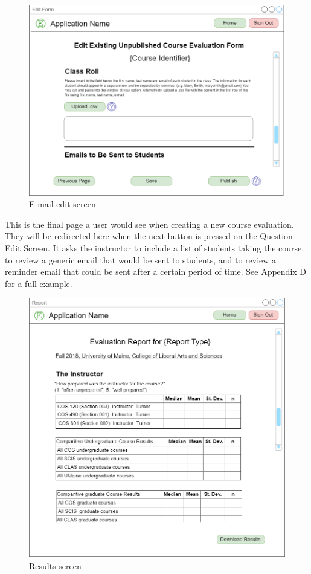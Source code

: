 \documentclass{article}
\begin{document}
\begin{center}
\begin{figure}[H]
    \centering
    \caption{E-mail edit screen}
    \includegraphics[scale=.30]{images/emails_screen.png}
\end{figure}
\end{center}

This is the final page a user would see when creating a new course evaluation. They will be redirected here when the next button is pressed on the Question Edit Screen. It asks the instructor to include a list of students taking the course, to review a generic email that would be sent to students, and to review a reminder email that could be sent after a certain period of time. See Appendix D for a full example.

\begin{center}
\begin{figure}[H]
    \centering
    \caption{Results screen}
    \includegraphics[scale=.25]{images/report_screen.png}
\end{figure}
\end{center}
\end{document}
